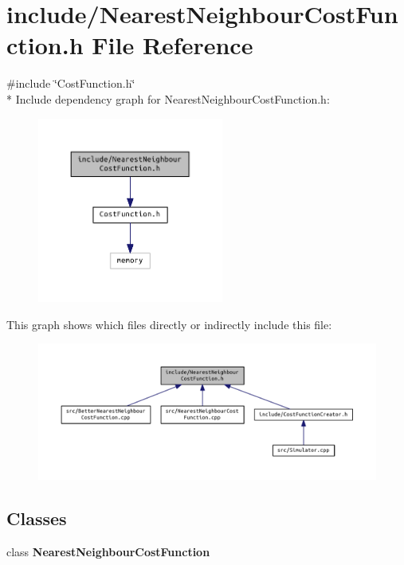 \section{include/\+Nearest\+Neighbour\+Cost\+Function.h File Reference}
\label{_nearest_neighbour_cost_function_8h}
{\ttfamily \#include \char`\"{}Cost\+Function.\+h\char`\"{}}\\*
Include dependency graph for Nearest\+Neighbour\+Cost\+Function.\+h\+:
\nopagebreak
\begin{figure}[H]
\begin{center}
\leavevmode
\includegraphics[width=173pt]{_nearest_neighbour_cost_function_8h__incl}
\end{center}
\end{figure}
This graph shows which files directly or indirectly include this file\+:
\nopagebreak
\begin{figure}[H]
\begin{center}
\leavevmode
\includegraphics[width=350pt]{_nearest_neighbour_cost_function_8h__dep__incl}
\end{center}
\end{figure}
\subsection*{Classes}
\begin{DoxyCompactItemize}
\item 
class {\bf Nearest\+Neighbour\+Cost\+Function}
\end{DoxyCompactItemize}
